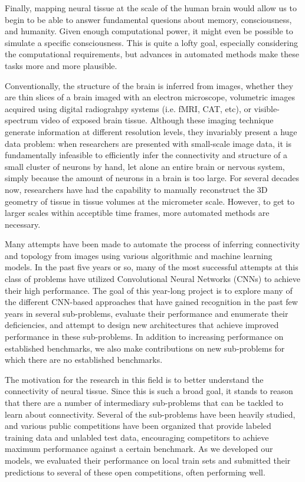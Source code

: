 Finally, mapping neural tissue at the scale of the human brain would allow us to begin to be able to answer fundamental quesions about memory, consciousness, and humanity. Given enough computational power, it might even be possible to simulate a specific consciousness. This is quite a lofty goal, especially considering the computational requirements, but advances in automated methods make these tasks more and more plausible.

Conventionally, the structure of the brain is inferred from images, whether they are thin slices of a brain imaged with an electron microscope, volumetric images acquired using digital radiograhpy systems (i.e. fMRI, CAT, etc), or visible-spectrum video of exposed brain tissue. Although these imaging technique generate information at different resolution levels, they invariably present a huge data problem: when researchers are presented with small-scale image data, it is fundamentally infeasible to efficiently infer the connectivity and structure of a small cluster of neurons by hand, let alone an entire brain or nervous system, simply because the amount of neurons in a brain is too large. For several decades now, researchers have had the capability to manually reconstruct the 3D geometry of tissue in tissue volumes at the micrometer scale\cite{White1986}. However, to get to larger scales within acceptible time frames, more automated methods are necessary.

Many attempts have been made to automate the process of inferring connectivity and topology from images using various algorithmic and machine learning models. In the past five years or so, many of the most successful attempts at this class of problems have utilized Convolutional Neural Networks (CNNs) to achieve their high performance. The goal of this year-long project is to explore many of the different CNN-based approaches that have gained recognition in the past few years in several sub-problems, evaluate their performance and enumerate their deficiencies, and attempt to design new architectures that achieve improved performance in these sub-problems. In addition to increasing performance on established benchmarks, we also make contributions on new sub-problems for which there are no established benchmarks.

The motivation for the research in this field is to better understand the connectivity of neural tissue. Since this is such a broad goal, it stands to reason that there are a number of intermediary sub-problems that can be tackled to learn about connectivity. Several of the sub-problems have been heavily studied, and various public competitions have been organized that provide labeled training data and unlabled test data, encouraging competitors to achieve maximum performance against a certain benchmark. As we developed our models, we evaluated their performance on local train sets and submitted their predictions to several of these open competitions, often performing well.

